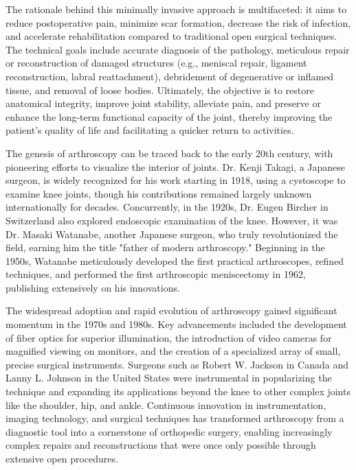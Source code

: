 The rationale behind this minimally invasive approach is multifaceted: it aims to reduce postoperative pain, minimize scar formation, decrease the risk of infection, and accelerate rehabilitation compared to traditional open surgical techniques. The technical goals include accurate diagnosis of the pathology, meticulous repair or reconstruction of damaged structures (e.g., meniscal repair, ligament reconstruction, labral reattachment), debridement of degenerative or inflamed tissue, and removal of loose bodies. Ultimately, the objective is to restore anatomical integrity, improve joint stability, alleviate pain, and preserve or enhance the long-term functional capacity of the joint, thereby improving the patient's quality of life and facilitating a quicker return to activities.

The genesis of arthroscopy can be traced back to the early 20th century, with pioneering efforts to visualize the interior of joints. Dr. Kenji Takagi, a Japanese surgeon, is widely recognized for his work starting in 1918, using a cystoscope to examine knee joints, though his contributions remained largely unknown internationally for decades. Concurrently, in the 1920s, Dr. Eugen Bircher in Switzerland also explored endoscopic examination of the knee. However, it was Dr. Masaki Watanabe, another Japanese surgeon, who truly revolutionized the field, earning him the title "father of modern arthroscopy." Beginning in the 1950s, Watanabe meticulously developed the first practical arthroscopes, refined techniques, and performed the first arthroscopic meniscectomy in 1962, publishing extensively on his innovations.

The widespread adoption and rapid evolution of arthroscopy gained significant momentum in the 1970s and 1980s. Key advancements included the development of fiber optics for superior illumination, the introduction of video cameras for magnified viewing on monitors, and the creation of a specialized array of small, precise surgical instruments. Surgeons such as Robert W. Jackson in Canada and Lanny L. Johnson in the United States were instrumental in popularizing the technique and expanding its applications beyond the knee to other complex joints like the shoulder, hip, and ankle. Continuous innovation in instrumentation, imaging technology, and surgical techniques has transformed arthroscopy from a diagnostic tool into a cornerstone of orthopedic surgery, enabling increasingly complex repairs and reconstructions that were once only possible through extensive open procedures.

